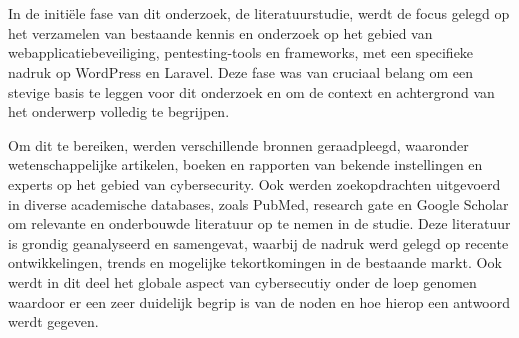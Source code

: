
\chapter{}%
\label{ch:methodologie}


In de initiële fase van dit onderzoek, de literatuurstudie, werdt de focus gelegd op het verzamelen van bestaande kennis 
en onderzoek op het gebied van webapplicatiebeveiliging, pentesting-tools en frameworks, met een specifieke nadruk op 
WordPress en Laravel. Deze fase was van cruciaal 
belang om een stevige basis te leggen voor dit onderzoek en om de context en achtergrond van het onderwerp volledig te 
begrijpen.

Om dit te bereiken, werden verschillende bronnen geraadpleegd, waaronder wetenschappelijke artikelen, boeken  
en rapporten van bekende instellingen en experts op het gebied van cybersecurity. 
Ook werden zoekopdrachten uitgevoerd in diverse academische databases, zoals PubMed, research gate en 
Google Scholar om relevante en onderbouwde literatuur op te nemen in de studie. Deze literatuur is grondig geanalyseerd en 
samengevat, waarbij de nadruk werd gelegd op recente ontwikkelingen, trends en mogelijke tekortkomingen in de bestaande markt.
Ook werdt in dit deel het globale aspect van cybersecutiy onder de loep genomen waardoor er een zeer duidelijk begrip 
is van de noden en hoe hierop een antwoord werdt gegeven.


